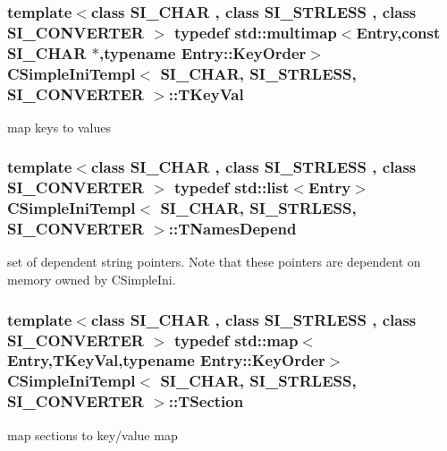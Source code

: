 \subsubsection[{\texorpdfstring{T\+Key\+Val}{TKeyVal}}]{\setlength{\rightskip}{0pt plus 5cm}template$<$class S\+I\+\_\+\+C\+H\+AR , class S\+I\+\_\+\+S\+T\+R\+L\+E\+SS , class S\+I\+\_\+\+C\+O\+N\+V\+E\+R\+T\+ER $>$ typedef std\+::multimap$<${\bf Entry},const S\+I\+\_\+\+C\+H\+AR $\ast$,typename {\bf Entry\+::\+Key\+Order}$>$ {\bf C\+Simple\+Ini\+Templ}$<$ S\+I\+\_\+\+C\+H\+AR, S\+I\+\_\+\+S\+T\+R\+L\+E\+SS, S\+I\+\_\+\+C\+O\+N\+V\+E\+R\+T\+ER $>$\+::{\bf T\+Key\+Val}}\hypertarget{a00069_ae7f0e11d84617214bd479de6332c80e6}{}\label{a00069_ae7f0e11d84617214bd479de6332c80e6}
map keys to values 
\subsubsection[{\texorpdfstring{T\+Names\+Depend}{TNamesDepend}}]{\setlength{\rightskip}{0pt plus 5cm}template$<$class S\+I\+\_\+\+C\+H\+AR , class S\+I\+\_\+\+S\+T\+R\+L\+E\+SS , class S\+I\+\_\+\+C\+O\+N\+V\+E\+R\+T\+ER $>$ typedef std\+::list$<${\bf Entry}$>$ {\bf C\+Simple\+Ini\+Templ}$<$ S\+I\+\_\+\+C\+H\+AR, S\+I\+\_\+\+S\+T\+R\+L\+E\+SS, S\+I\+\_\+\+C\+O\+N\+V\+E\+R\+T\+ER $>$\+::{\bf T\+Names\+Depend}}\hypertarget{a00069_a391b3f3751e06cd9e9de4fb16ac14342}{}\label{a00069_a391b3f3751e06cd9e9de4fb16ac14342}
set of dependent string pointers. Note that these pointers are dependent on memory owned by C\+Simple\+Ini. 
\subsubsection[{\texorpdfstring{T\+Section}{TSection}}]{\setlength{\rightskip}{0pt plus 5cm}template$<$class S\+I\+\_\+\+C\+H\+AR , class S\+I\+\_\+\+S\+T\+R\+L\+E\+SS , class S\+I\+\_\+\+C\+O\+N\+V\+E\+R\+T\+ER $>$ typedef std\+::map$<${\bf Entry},{\bf T\+Key\+Val},typename {\bf Entry\+::\+Key\+Order}$>$ {\bf C\+Simple\+Ini\+Templ}$<$ S\+I\+\_\+\+C\+H\+AR, S\+I\+\_\+\+S\+T\+R\+L\+E\+SS, S\+I\+\_\+\+C\+O\+N\+V\+E\+R\+T\+ER $>$\+::{\bf T\+Section}}\hypertarget{a00069_a2e7963455f680abd0d6901786495a665}{}\label{a00069_a2e7963455f680abd0d6901786495a665}
map sections to key/value map 

